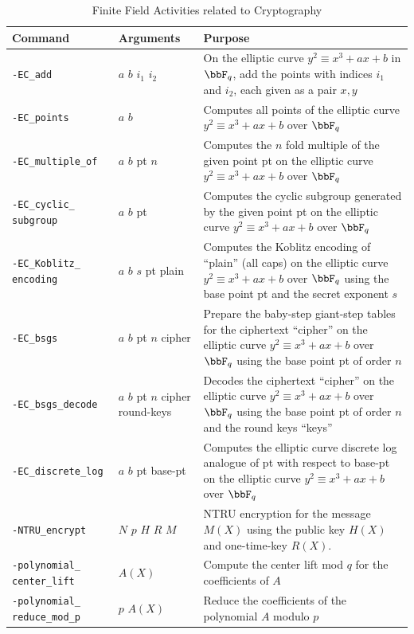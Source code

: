 \begin{table}
	\begin{center}
	\begin{tabular}{|p{4cm}|p{3cm}|p{7cm}|}
		\hline
		Command & Arguments & Purpose \\
		\hline
		\verb'-EC_add' & $a$ $b$ $i_1$ $i_2$ & On the elliptic curve $y^2\equiv x^3 + ax+b$ in $\bbF_q$, 
		add the points with indices $i_1$ and $i_2$, each given as a pair $x,y$\\
		\hline
		\verb'-EC_points' & $a$ $b$  & Computes all points of the elliptic curve $y^2\equiv x^3 + ax+b$ over $\bbF_q$ \\
		\hline
		\verb'-EC_multiple_of' & $a$ $b$ pt $n$ & Computes the $n$ fold multiple of the given point pt on the elliptic curve $y^2\equiv x^3 + ax+b$ over $\bbF_q$\\
		\hline
		\verb'-EC_cyclic_' \verb'subgroup' & $a$ $b$ pt  & Computes the cyclic subgroup generated by the given point pt on the elliptic curve $y^2\equiv x^3 + ax+b$ over $\bbF_q$\\
		\hline
		\verb'-EC_Koblitz_' \verb'encoding' & $a$ $b$ $s$ pt plain  & Computes the Koblitz encoding of ``plain'' (all caps) on the elliptic curve $y^2\equiv x^3 + ax+b$ over $\bbF_q$ using the base point pt and the secret exponent $s$ \\
		\hline
		\verb'-EC_bsgs' & $a$ $b$ pt $n$ cipher  & Prepare the baby-step giant-step tables for the ciphertext ``cipher'' on the elliptic curve $y^2\equiv x^3 + ax+b$ over $\bbF_q$ using the base point pt of order $n$\\
		\hline
		\verb'-EC_bsgs_decode' & $a$ $b$ pt $n$ cipher round-keys & Decodes the ciphertext ``cipher'' on the elliptic curve $y^2\equiv x^3 + ax+b$ over $\bbF_q$ using the base point pt of order $n$ and the round keys ``keys''\\
		\hline
		\verb'-EC_discrete_log' & $a$ $b$ pt base-pt & Computes the elliptic curve discrete log analogue of pt with respect to base-pt on the elliptic curve $y^2\equiv x^3 + ax+b$ over $\bbF_q$ \\
		\hline
		\verb'-NTRU_encrypt' & $N$ $p$ $H$ $R$ $M$ & NTRU encryption for the message $M(X)$ using the public key $H(X)$ and one-time-key $R(X)$. \\
		\hline
		\verb'-polynomial_' \verb'center_lift' & $A(X)$   & Compute the center lift mod $q$ for the coefficients of $A$ \\
		\hline
		\verb'-polynomial_' \verb'reduce_mod_p' & $p$ $A(X)$   &  Reduce the coefficients of the polynomial $A$ modulo $p$\\
		\hline
		\end{tabular}
	\end{center}
	\caption{\label{tab:crypto2}Finite Field Activities related to Cryptography}
	\end{table}
